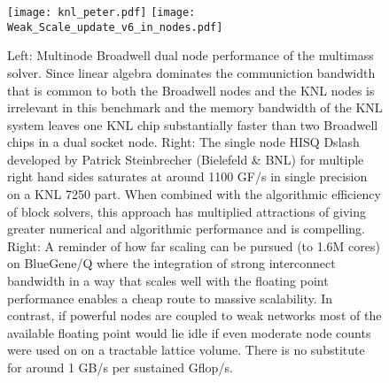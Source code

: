 \documentclass{PoS}
\begin{document}
\begin{figure}[hbt]
\texttt{[image: knl\_peter.pdf]}
\texttt{[image: Weak\_Scale\_update\_v6\_in\_nodes.pdf]}
\caption{\label{fig:patrick}
Left: Multinode Broadwell dual node performance of the multimass solver. Since linear algebra dominates the communiction
bandwidth that is common to both the Broadwell nodes and the KNL nodes is irrelevant in this benchmark and the memory bandwidth
of the KNL system leaves one KNL chip substantially faster than two Broadwell chips in a dual socket node.
Right: The single node HISQ Dslash developed by Patrick Steinbrecher (Bielefeld \& BNL)\cite{steinbrecher}
for multiple right hand sides saturates at around 1100 GF/s in single precision on a
KNL 7250 part. When combined with the algorithmic efficiency of block solvers\cite{Wagner}, this
approach has multiplied attractions of giving greater numerical and algorithmic performance and is compelling.
Right: A reminder of how far scaling can be pursued (to 1.6M cores) on BlueGene/Q where the integration of 
strong interconnect bandwidth in a way that scales well with the floating point performance enables
a cheap route to massive scalability. In contrast, if powerful nodes are coupled to weak networks most
of the available floating point would lie idle if even moderate node counts were used on on a tractable lattice volume.
There is no substitute for around 1 GB/s per sustained Gflop/s.
}
\end{figure}
\end{document}
